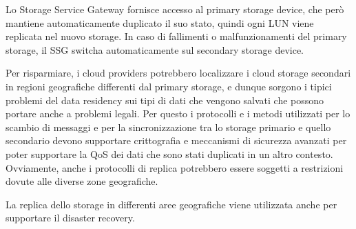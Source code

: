 Lo Storage Service Gateway fornisce accesso al primary storage device, che però mantiene automaticamente duplicato il suo stato, quindi ogni LUN viene replicata nel nuovo storage. In caso di fallimenti o malfunzionamenti del primary storage, il SSG switcha automaticamente sul secondary storage device.

Per risparmiare, i cloud providers potrebbero localizzare i cloud storage secondari in regioni geografiche differenti dal primary storage, e dunque sorgono i tipici problemi del data residency sui tipi di dati che vengono salvati che possono portare anche a problemi legali. Per questo i protocolli e i metodi utilizzati per lo scambio di messaggi e per la sincronizzazione tra lo storage primario e quello secondario devono supportare crittografia e meccanismi di sicurezza avanzati per poter supportare la QoS dei dati che sono stati duplicati in un altro contesto. Ovviamente, anche i protocolli di replica potrebbero essere soggetti a restrizioni dovute alle diverse zone geografiche. 

La replica dello storage in differenti aree geografiche viene utilizzata anche per supportare il disaster recovery.

